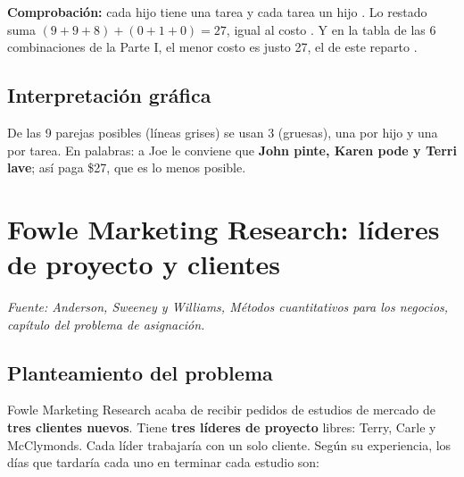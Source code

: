 \documentclass[11pt,a4paper]{article}
\begin{document}
\textbf{Comprobación:} cada hijo tiene una tarea y cada tarea un hijo \checkmark. Lo restado suma
$(9 + 9 + 8) + (0 + 1 + 0) = 27$, igual al costo \checkmark. Y en la tabla de las 6 combinaciones de la Parte I,
el menor costo es justo 27, el de este reparto \checkmark.

\subsection*{Interpretación gráfica}
\noindent\begin{minipage}[c]{0.52\textwidth}\centering
{}
\end{minipage}\hfill
\begin{minipage}[c]{0.44\textwidth}
De las 9 parejas posibles (líneas grises) se usan 3 (gruesas), una por hijo y una por tarea. En palabras: a Joe le
conviene que \textbf{John pinte, Karen pode y Terri lave}; así paga \$27, que es lo menos posible.
\end{minipage}
\par

\section{Fowle Marketing Research: líderes de proyecto y clientes}
\textit{Fuente: Anderson, Sweeney y Williams, Métodos cuantitativos para los negocios, capítulo del problema de asignación.}

\subsection*{Planteamiento del problema}
Fowle Marketing Research acaba de recibir pedidos de estudios de mercado de \textbf{tres clientes nuevos}. Tiene
\textbf{tres líderes de proyecto} libres: Terry, Carle y McClymonds. Cada líder trabajaría con un solo cliente. Según
su experiencia, los días que tardaría cada uno en terminar cada estudio son:
\end{document}

